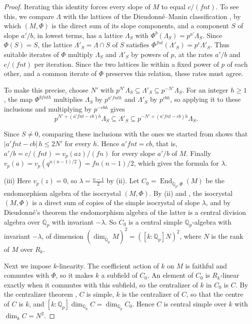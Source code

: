 \documentclass[a4paper,11pt]{amsart}
\theoremstyle{definition}
\theoremstyle{remark}
\numberwithin{equation}{section}
\newcommand{\Q}{\mathbb{Q}}
\DeclareMathOperator{\End}{End}
\newcommand{\Qb}{\breve{\mathbb{Q}}_p}
\begin{document}
\begin{proof}
Iterating this identity forces every slope of $M$ to equal $c/(fnt)$. To see this, we compare $\Lambda$ with the lattices of the Dieudonn\'e--Manin classification \cite[Theorem~1.1.1]{Cre25}, by which $(M,\Phi)$ is the direct sum of its slope components, and a component $S$ of slope $a'/b$, in lowest terms, has a lattice $\Lambda_S$ with $\Phi^b(\Lambda_S)=p^{a'}\Lambda_S$. Since $\Phi(S)=S$, the lattice $\Lambda'_S=\Lambda\cap S$ of $S$ satisfies $\Phi^{fnt}(\Lambda'_S)=p^c\Lambda'_S$. Thus suitable iterates of $\Phi$ multiply $\Lambda_S$ and $\Lambda'_S$ by powers of $p$, at the rates $a'/b$ and $c/(fnt)$ per iteration. Since the two lattices lie within a fixed power of $p$ of each other, and a common iterate of $\Phi$ preserves this relation, these rates must agree.

To make this precise, choose $N'$ with $p^{N'}\Lambda_S\subseteq\Lambda'_S\subseteq p^{-N'}\Lambda_S$. For an integer $h\geq1$, the map $\Phi^{bfnth}$ multiplies $\Lambda_S$ by $p^{a'fnth}$ and $\Lambda'_S$ by $p^{cbh}$, so applying it to these inclusions and multiplying by $p^{-cbh}$ gives
\[
 p^{N'+(a'fnt-cb)h}\Lambda_S\subseteq\Lambda'_S \subseteq p^{-N'+(a'fnt-cb)h}\Lambda_S.
\]

Since $S\neq0$, comparing these inclusions with the ones we started from shows that $|a'fnt-cb|\,h\leq2N'$ for every $h$. Hence $a'fnt=cb$, that is, $a'/b=c/(fnt)=v_p(az)/(fn)$ for every slope $a'/b$ of $M$. Finally $v_p(a)=v_p(q^{n(n-1)/2})=fn(n-1)/2$, which gives the formula for $\lambda$.

(iii) Here $v_p(z)=0$, so $\lambda=\frac{n-1}2$ by (ii). Let $C_0=\End_{\Qb,\Phi}(M)$ be the endomorphism algebra of the isocrystal $(M,\Phi)$. By (ii) and \cite[Theorem~1.1.1]{Cre25}, the isocrystal $(M,\Phi)$ is a direct sum of copies of the simple isocrystal of slope $\lambda$, and by Dieudonn\'e's theorem \cite[Theorem~1.1.2]{Cre25} the endomorphism algebra of the latter is a central division algebra over $\Q_p$ with invariant $-\lambda$. So $C_0$ is a central simple $\Q_p$-algebra with invariant $-\lambda$, of dimension $(\dim_{\Qb}M)^2=([k:\Q_p]N)^2$, where $N$ is the rank of $M$ over $R_k$.

Next we impose $k$-linearity. The coefficient action of $k$ on $M$ is faithful and commutes with $\Phi$, so it makes $k$ a subfield of $C_0$. An element of $C_0$ is $R_k$-linear exactly when it commutes with this subfield, so the centralizer of $k$ in $C_0$ is $C$. By the centralizer theorem \cite[IV, Theorem~3.1]{Mil20}, $C$ is simple, $k$ is the centralizer of $C$, so that the centre of $C$ is $k$, and $[k:\Q_p]\dim_{\Q_p}C=\dim_{\Q_p}C_0$. Hence $C$ is central simple over $k$ with $\dim_kC=N^2$.


\end{proof}
\end{document}

